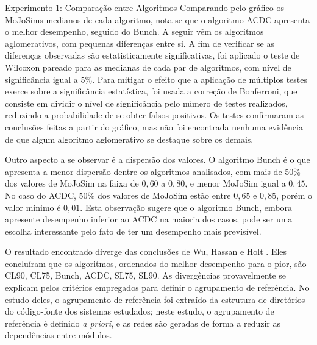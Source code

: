\begin{section}{Experimento 1: Comparação entre Algoritmos}
Comparando pelo gráfico os MoJoSims medianos de cada algoritmo, nota-se que o algoritmo ACDC apresenta o melhor desempenho, seguido do Bunch. A seguir vêm os algoritmos aglomerativos, com pequenas diferenças entre si. A fim de verificar se as diferenças observadas são estatisticamente significativas, foi aplicado o teste de Wilcoxon pareado para as medianas de cada par de algoritmos, com nível de significância igual a 5\%. Para mitigar o efeito que a aplicação de múltiplos testes exerce sobre a significância estatística, foi usada a correção de Bonferroni, que consiste em dividir o nível de significância pelo número de testes realizados, reduzindo a probabilidade de se obter falsos positivos. Os testes confirmaram as conclusões feitas a partir do gráfico, mas não foi encontrada nenhuma evidência de que algum algoritmo aglomerativo se destaque sobre os demais.



Outro aspecto a se observar é a dispersão dos valores. O algoritmo Bunch é o que apresenta a menor dispersão dentre os algoritmos analisados, com mais de 50\% dos valores de MoJoSim na faixa de $0,60$ a $0,80$, e menor MoJoSim igual a $0,45$. No caso do ACDC, 50\% dos valores de MoJoSim estão entre $0,65$ e $0,85$, porém o valor mínimo é $0,01$. Esta observação sugere que o algoritmo Bunch, embora apresente desempenho inferior ao ACDC na maioria dos casos, pode ser uma escolha interessante pelo fato de ter um desempenho mais previsível.

O resultado encontrado diverge das conclusões de Wu, Hassan e Holt \cite{Wu2005}. Eles concluíram que os algoritmos, ordenados do melhor desempenho para o pior, são CL90, CL75, Bunch, ACDC, SL75, SL90. As divergências provavelmente se explicam pelos critérios empregados para definir o agrupamento de referência. No estudo deles, o agrupamento de referência foi extraído da estrutura de diretórios do código-fonte dos sistemas estudados; neste estudo, o agrupamento de referência é definido \emph{a priori}, e as redes são geradas de forma a reduzir as dependências entre módulos.


\end{section}
